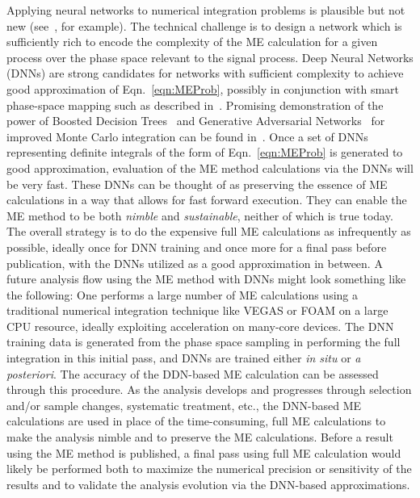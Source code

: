 Applying neural networks to numerical integration problems is plausible but not new (see~\cite{CSEarticle2006,TICNC4344207,IJMC2013}, for example). The technical challenge is to design a network which is sufficiently rich to encode the complexity of the ME calculation for a given process over the phase space relevant to the signal process. Deep Neural Networks (DNNs) are strong candidates for networks with sufficient complexity to achieve good approximation of Eqn.~\ref{eqn:MEProb}, possibly in conjunction with smart phase-space mapping such as described in~\cite{Artoisenet:2010cn}. Promising demonstration of the power of Boosted Decision Trees~\cite{friedman2000,friedman2001} and Generative Adversarial Networks~\cite{GAN2014arXiv1406.2661G} for improved Monte Carlo integration can be found in~\cite{Bendavid:2017zhk}. Once a set of DNNs representing definite integrals of the form of Eqn.~\ref{eqn:MEProb} is generated to good approximation, evaluation of the ME method calculations via the DNNs will be very fast. These DNNs can be thought of as preserving the essence of ME calculations in a way that allows for fast forward execution. They can enable the ME method to be both \emph{nimble} and \emph{sustainable}, neither of which is true today.\\

The overall strategy is to do the expensive full ME calculations as infrequently as possible, ideally once for DNN training and once more for a final pass before publication, with the DNNs utilized as a good approximation in between. A future analysis flow using the ME method with DNNs might look something like the following: One performs a large number of ME calculations using a traditional numerical integration technique like {\sf VEGAS} or {\sf FOAM} on a large CPU resource, ideally exploiting acceleration on many-core devices. The DNN training data is generated from the phase space sampling in performing the full integration in this initial pass, and DNNs are trained either \emph{in situ} or \emph{a posteriori}. The accuracy of the DDN-based ME calculation can be assessed through this procedure. As the analysis develops and progresses through selection and/or sample changes, systematic treatment, etc., the DNN-based ME calculations are used in place of the time-consuming, full ME calculations to make the analysis nimble and to preserve the ME calculations. Before a result using the ME method is published, a final pass using full ME calculation would likely be performed both to maximize the numerical precision or sensitivity of the results and to validate the analysis evolution via the DNN-based approximations.\\

